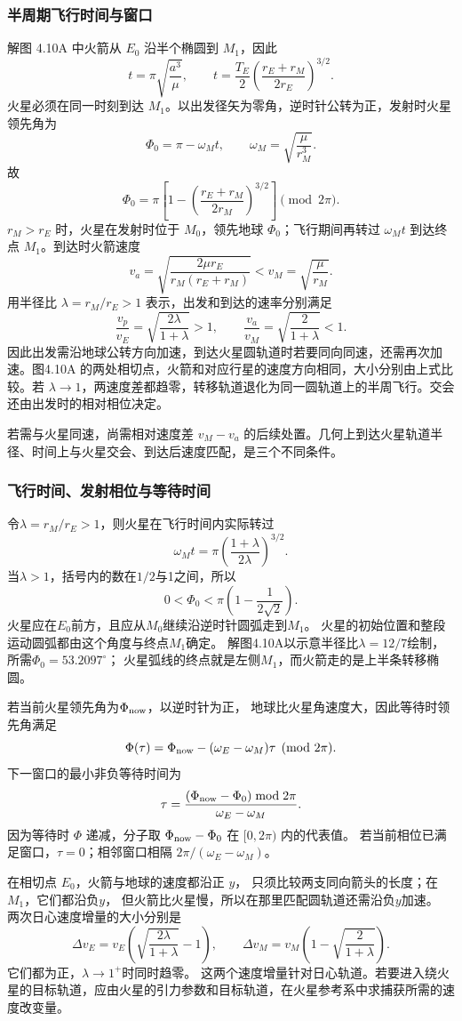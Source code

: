 \documentclass[UTF8,fontset=fandol,a4paper,11pt]{ctexart}
\begin{document}
\subsubsection*{半周期飞行时间与窗口}
解图 4.10A 中火箭从 $E_0$ 沿半个椭圆到 $M_1$，因此
\[
t=\pi\sqrt{\frac{a^3}\mu},\qquad
\boxed{t=\frac{T_E}{2}\left(\frac{r_E+r_M}{2r_E}\right)^{3/2}}.
\]
火星必须在同一时刻到达 $M_1$。以出发径矢为零角，逆时针公转为正，发射时火星领先角为
\[
\Phi_0=\pi-\omega_Mt,
\qquad \omega_M=\sqrt{\frac\mu{r_M^3}}.
\]
故
\[
\boxed{\Phi_0=\pi\left[1-\left(\frac{r_E+r_M}{2r_M}\right)^{3/2}\right]}
\pmod{2\pi}.
\]
$r_M>r_E$ 时，火星在发射时位于 $M_0$，领先地球 $\Phi_0$；飞行期间再转过 $\omega_Mt$ 到达终点 $M_1$。到达时火箭速度
\[
v_a=\sqrt{\frac{2\mu r_E}{r_M(r_E+r_M)}}
<v_M=\sqrt{\frac\mu{r_M}}.
\]
用半径比 $\lambda=r_M/r_E>1$ 表示，出发和到达的速率分别满足
\[\frac{v_p}{v_E}=\sqrt{\frac{2\lambda}{1+\lambda}}>1,
\qquad\frac{v_a}{v_M}=\sqrt{\frac{2}{1+\lambda}}<1.\]
因此出发需沿地球公转方向加速，到达火星圆轨道时若要同向同速，还需再次加速。图4.10A 的两处相切点，火箭和对应行星的速度方向相同，大小分别由上式比较。若 $\lambda\to1$，两速度差都趋零，转移轨道退化为同一圆轨道上的半周飞行。交会还由出发时的相对相位决定。

若需与火星同速，尚需相对速度差 $v_M-v_a$ 的后续处置。几何上到达火星轨道半径、时间上与火星交会、到达后速度匹配，是三个不同条件。
\subsubsection*{飞行时间、发射相位与等待时间}
令$\lambda=r_M/r_E>1$，则火星在飞行时间内实际转过
\[
\omega_Mt=\pi\left(\frac{1+\lambda}{2\lambda}\right)^{3/2}.
\]
当$\lambda>1$，括号内的数在$1/2$与1之间，所以
\[
0<\Phi_0<\pi\left(1-\frac1{2\sqrt2}\right).
\]
火星应在$E_0$前方，且应从$M_0$继续沿逆时针圆弧走到$M_1$。
火星的初始位置和整段运动圆弧都由这个角度与终点$M_1$确定。
解图4.10A以示意半径比$\lambda=12/7$绘制，所需$\Phi_0=53.2097^\circ$；
火星弧线的终点就是左侧$M_1$，而火箭走的是上半条转移椭圆。

若当前火星领先角为$\Phi_{\rm now}$，以逆时针为正，
地球比火星角速度大，因此等待时领先角满足
\[
\Phi(\tau)=\Phi_{\rm now}-(\omega_E-\omega_M)\tau
\pmod{2\pi}.
\]
下一窗口的最小非负等待时间为
\[
\tau=\frac{(\Phi_{\rm now}-\Phi_0)\bmod2\pi}
{\omega_E-\omega_M}.
\]
因为等待时 $\Phi$ 递减，分子取 $\Phi_{\rm now}-\Phi_0$ 在 $[0,2\pi)$ 内的代表值。
若当前相位已满足窗口，$\tau=0$；相邻窗口相隔
$2\pi/(\omega_E-\omega_M)$。

在相切点 $E_0$，火箭与地球的速度都沿正 $y$，
只须比较两支同向箭头的长度；在$M_1$，它们都沿负$y$，
但火箭比火星慢，所以在那里匹配圆轨道还需沿负$y$加速。
两次日心速度增量的大小分别是
\[
\Delta v_E=v_E\left(\sqrt{\frac{2\lambda}{1+\lambda}}-1\right),
\qquad
\Delta v_M=v_M\left(1-\sqrt{\frac{2}{1+\lambda}}\right).
\]
它们都为正，$\lambda\to1^+$时同时趋零。
这两个速度增量针对日心轨道。若要进入绕火星的目标轨道，应由火星的引力参数和目标轨道，在火星参考系中求捕获所需的速度改变量。
\end{document}
